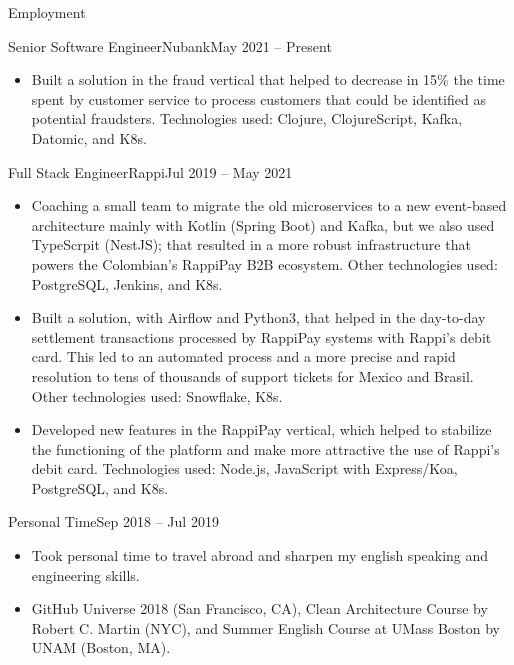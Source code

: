 \documentclass[calibri]{../macdowell-cv/mcdowellcv}
\begin{document}
	\begin{cvsection}{Employment}
		\begin{cvsubsection}{Senior Software Engineer}{Nubank}{May 2021 -- Present}
			\begin{itemize}
				\item Built a solution in the fraud vertical that helped to decrease in 15\% the time spent by customer service to process customers that could be identified as potential fraudsters. Technologies used: Clojure, ClojureScript, Kafka, Datomic, and K8s.
			\end{itemize}
		\end{cvsubsection}

		\begin{cvsubsection}{Full Stack Engineer}{Rappi}{Jul 2019 -- May 2021}
			\begin{itemize}
				\item Coaching a small team to migrate the old microservices to a new event-based architecture mainly with Kotlin (Spring Boot) and Kafka, but we also used TypeScrpit (NestJS); that resulted in a more robust infrastructure that powers the Colombian's RappiPay B2B ecosystem. Other technologies used: PostgreSQL, Jenkins, and K8s.
			\end{itemize}
			\begin{itemize}
				\item Built a solution, with Airflow and Python3, that helped in the day-to-day settlement transactions processed by RappiPay systems with Rappi's debit card. This led to an automated process and a more precise and rapid resolution to tens of thousands of support tickets for Mexico and Brasil. Other technologies used: Snowflake, K8s.
			\end{itemize}
			\begin{itemize}
				\item Developed new features in the RappiPay vertical, which helped to stabilize the functioning of the platform and make more attractive the use of Rappi's debit card. Technologies used: Node.js, JavaScript with Express/Koa, PostgreSQL, and K8s.
			\end{itemize}
		\end{cvsubsection}

		\begin{cvsubsection}{}{Personal Time}{Sep 2018 -- Jul 2019}
			\begin{itemize}
				\item Took personal time to travel abroad and sharpen my english speaking and engineering skills.
				\item GitHub Universe 2018 (San Francisco, CA), Clean Architecture Course by Robert C. Martin (NYC), and Summer English Course at UMass Boston by UNAM (Boston, MA).
			\end{itemize}
		\end{cvsubsection}


\end{cvsection}
\end{document}
